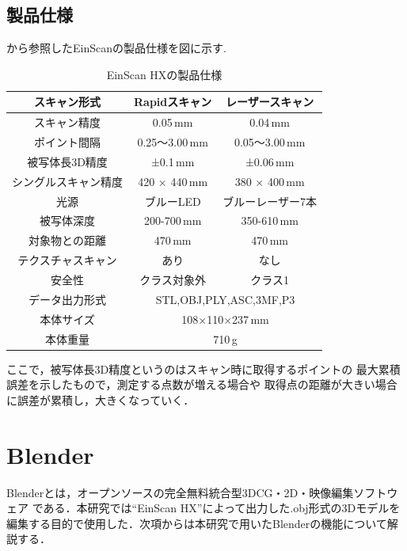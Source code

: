 \documentclass{ltjsreport}
\begin{document}
		\subsection{製品仕様}
			\cite{ref:4}から参照したEinScanの製品仕様を図に示す.
			\begin{table}[H]
			\begin{center}
			\caption{EinScan HXの製品仕様}
			\label{tab:EinScan}
			\begin{tabular}{c|cc} \toprule
				スキャン形式&Rapidスキャン&レーザースキャン\\ \hline
				スキャン精度&0.05\,mm&0.04\,mm\\
				ポイント間隔&0.25～3.00\,mm&0.05～3.00\,mm\\
				被写体長3D精度&±0.1\,mm&±0.06\,mm\\
				シングルスキャン精度&420 × 440\,mm&380 × 400\,mm\\
				光源&ブルーLED&ブルーレーザー7本\\
				被写体深度&200-700\,mm&350-610\,mm\\
				対象物との距離&470\,mm&470\,mm\\
				テクスチャスキャン&あり&なし\\
				安全性&クラス対象外&クラス1\\ \hline
				データ出力形式&\multicolumn{2}{c}{STL,OBJ,PLY,ASC,3MF,P3}\\
				本体サイズ&\multicolumn{2}{c}{108×110×237\,mm}\\
				本体重量&\multicolumn{2}{c}{710\,g}\\
				\bottomrule
			\end{tabular}
			\end{center}
			\end{table}
			ここで，被写体長3D精度というのはスキャン時に取得するポイントの
			最大累積誤差を示したもので，測定する点数が増える場合や
			取得点の距離が大きい場合に誤差が累積し，大きくなっていく．

	\section{Blender}
		Blenderとは，オープンソースの完全無料統合型3DCG・2D・映像編集ソフトウェア
		である．本研究では``EinScan HX''によって出力した.obj形式の3Dモデルを
		編集する目的で使用した．次項からは本研究で用いたBlenderの機能について解説する．
\end{document}
